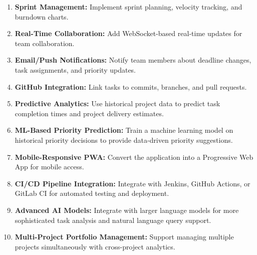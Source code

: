 \documentclass[12pt,a4paper,oneside]{report}
\begin{document}
\begin{enumerate}[noitemsep]
  \item \textbf{Sprint Management:} Implement sprint planning, velocity tracking, and burndown charts.
  \item \textbf{Real-Time Collaboration:} Add WebSocket-based real-time updates for team collaboration.
  \item \textbf{Email/Push Notifications:} Notify team members about deadline changes, task assignments, and priority updates.
  \item \textbf{GitHub Integration:} Link tasks to commits, branches, and pull requests.
  \item \textbf{Predictive Analytics:} Use historical project data to predict task completion times and project delivery estimates.
  \item \textbf{ML-Based Priority Prediction:} Train a machine learning model on historical priority decisions to provide data-driven priority suggestions.
  \item \textbf{Mobile-Responsive PWA:} Convert the application into a Progressive Web App for mobile access.
  \item \textbf{CI/CD Pipeline Integration:} Integrate with Jenkins, GitHub Actions, or GitLab CI for automated testing and deployment.
  \item \textbf{Advanced AI Models:} Integrate with larger language models for more sophisticated task analysis and natural language query support.
  \item \textbf{Multi-Project Portfolio Management:} Support managing multiple projects simultaneously with cross-project analytics.
\end{enumerate}
\end{document}
